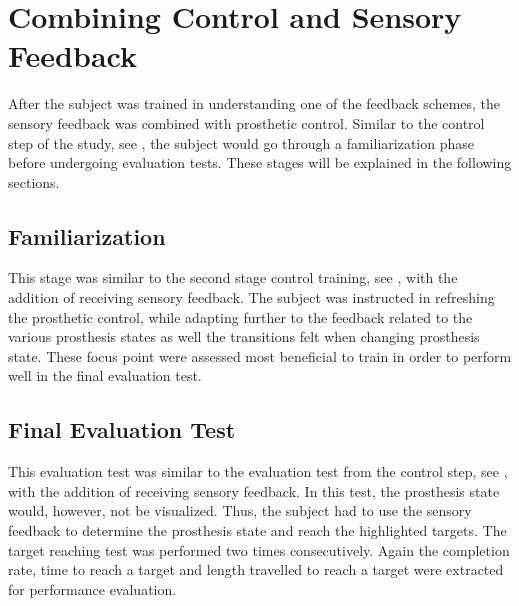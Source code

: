 \section{Combining Control and Sensory Feedback}
After the subject was trained in understanding one of the feedback schemes, the sensory feedback was combined with prosthetic control. Similar to the control step of the study, see , the subject would go through a familiarization phase before undergoing evaluation tests. These stages will be explained in the following sections.

\subsection{Familiarization}
This stage was similar to the second stage control training, see , with the addition of receiving sensory feedback. The subject was instructed in refreshing the prosthetic control, while adapting further to the feedback related to the various prosthesis states as well the transitions felt when changing prosthesis state. These focus point were assessed most beneficial to train in order to perform well in the final evaluation test. 

\subsection{Final Evaluation Test}
This evaluation test was similar to the evaluation test from the control step, see , with the addition of receiving sensory feedback. In this test, the prosthesis state would, however, not be visualized. Thus, the subject had to use the sensory feedback to determine the prosthesis state and reach the highlighted targets. The target reaching test was performed two times consecutively. Again the completion rate, time to reach a target and length travelled to reach a target were extracted for performance evaluation.